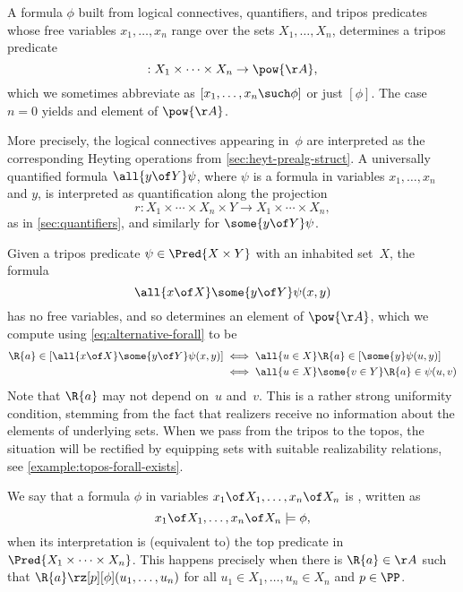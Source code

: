 A formula $\phi$ built from logical connectives, quantifiers, and tripos predicates
whose free variables $x_1, \ldots, x_n$ range over the sets $X_1, \ldots, X_n$,
determines a tripos predicate
%
\begin{equation*}
  [x_1 \of X_1, \ldots, x_n \of X_n \such \phi] : X_1 \times \cdots \times X_n \to \pow{\AA},
\end{equation*}
%
which we sometimes abbreviate as $[x_1, \ldots, x_n \such \phi]$ or just $[\phi]$.
The case $n = 0$ yields and element of $\pow{\AA}$.

More precisely, the logical connectives appearing in~$\phi$ are interpreted as the corresponding Heyting operations from \cref{sec:heyt-prealg-struct}.
A universally quantified formula $\all{y \of Y} \psi$, where $\psi$ is a formula in variables $x_1, \ldots, x_n$ and $y$, is interpreted as quantification along the projection
%
\begin{equation*}
  r : X_1 \times \cdots \times X_n \times Y \to X_1 \times \cdots \times X_n,
\end{equation*}
%
as in \cref{sec:quantifiers}, and similarly for $\some{y \of Y} \psi$.

\begin{example}
  \label{example:tripos-forall-exists}
  Given a tripos predicate $\psi \in \Pred{X \times Y}$ with an inhabited set~$X$, the formula
  \begin{equation*}
    \all{x \of X} \some{y \of Y} \psi(x,y)
  \end{equation*}
  has no free variables, and so determines an element of $\pow{\AA}$,
  which we compute using \eqref{eq:alternative-forall} to be
  \begin{align*}
    \R{a} \in [\all{x \of X} \some{y \of Y} \psi(x,y)]
    &\iff
      \all{u \in X}
      \R{a} \in [\some{y} \psi(u, y)]
    \\
    &\iff
      \all{u \in X}
      \some{v \in Y}
      \R{a} \in \psi(u, v)
  \end{align*}
  Note that $\R{a}$ may not depend on~$u$ and~$v$.
  This is a rather strong uniformity condition, stemming from the fact that realizers receive no information about the elements of underlying sets. When we pass from the tripos to the topos, the situation will be rectified by equipping sets with suitable realizability relations, see \cref{example:topos-forall-exists}.
\end{example}

We say that a formula $\phi$ in variables $x_1 \of X_1, \ldots, x_n \of X_n$ is , written as
%
\begin{equation*}
  x_1 \of X_1, \ldots, x_n \of X_n \models \phi,
\end{equation*}
%
when its interpretation is (equivalent to) the top predicate in $\Pred{X_1 \times \cdots \times X_n}$. This happens precisely when there is $\R{a} \in \AA$ such that $\R{a} \rz[p] [\phi](u_1, \ldots, u_n)$ for all $u_1 \in X_1, \ldots, u_n \in X_n$ and $p \in \PP$.


